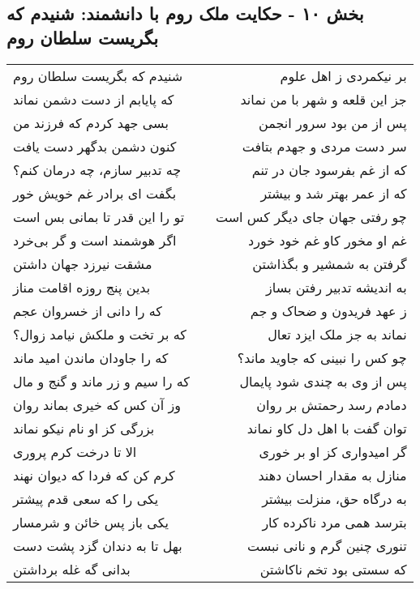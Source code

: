 \begin{center}
\section*{بخش ۱۰ - حکایت ملک روم با دانشمند: شنیدم که بگریست سلطان روم}
\label{sec:010}
\begin{longtable}{l p{0.5cm} r}
شنیدم که بگریست سلطان روم
&&
بر نیکمردی ز اهل علوم
\\
که پایابم از دست دشمن نماند
&&
جز این قلعه و شهر با من نماند
\\
بسی جهد کردم که فرزند من
&&
پس از من بود سرور انجمن
\\
کنون دشمن بدگهر دست یافت
&&
سر دست مردی و جهدم بتافت
\\
چه تدبیر سازم، چه درمان کنم؟
&&
که از غم بفرسود جان در تنم
\\
بگفت ای برادر غم خویش خور
&&
که از عمر بهتر شد و بیشتر
\\
تو را این قدر تا بمانی بس است
&&
چو رفتی جهان جای دیگر کس است
\\
اگر هوشمند است و گر بی‌خرد
&&
غم او مخور کاو غم خود خورد
\\
مشقت نیرزد جهان داشتن
&&
گرفتن به شمشیر و بگذاشتن
\\
بدین پنج روزه اقامت مناز
&&
به اندیشه تدبیر رفتن بساز
\\
که را دانی از خسروان عجم
&&
ز عهد فریدون و ضحاک و جم
\\
که بر تخت و ملکش نیامد زوال؟
&&
نماند به جز ملک ایزد تعال
\\
که را جاودان ماندن امید ماند
&&
چو کس را نبینی که جاوید ماند؟
\\
که را سیم و زر ماند و گنج و مال
&&
پس از وی به چندی شود پایمال
\\
وز آن کس که خیری بماند روان
&&
دمادم رسد رحمتش بر روان
\\
بزرگی کز او نام نیکو نماند
&&
توان گفت با اهل دل کاو نماند
\\
الا تا درخت کرم پروری
&&
گر امیدواری کز او بر خوری
\\
کرم کن که فردا که دیوان نهند
&&
منازل به مقدار احسان دهند
\\
یکی را که سعی قدم پیشتر
&&
به درگاه حق، منزلت بیشتر
\\
یکی باز پس خائن و شرمسار
&&
بترسد همی مرد ناکرده کار
\\
بهل تا به دندان گزد پشت دست
&&
تنوری چنین گرم و نانی نبست
\\
بدانی گه غله برداشتن
&&
که سستی بود تخم ناکاشتن
\\
\end{longtable}
\end{center}
